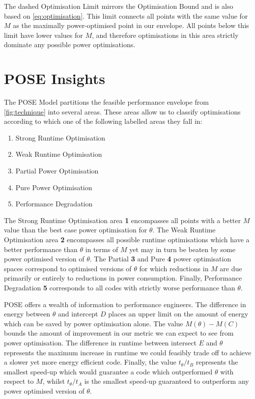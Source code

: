 The dashed Optimisation Limit  mirrors the Optimisation Bound and is also based on \autoref{eq:optimisation}.
This limit connects all points with the same value for $M$ as the maximally power-optimised point in our envelope.
All points below this limit have lower values for $M$, and therefore optimisations in this area strictly dominate any possible power optimisations. 

\section{POSE Insights}
\label{sec:insights}
The POSE Model partitions the feasible performance envelope from \autoref{fig:technique} into several areas.
These areas allow us to classify optimisations according to which one of the following labelled areas they fall in:

\begin{multicols}{2}
\begin{enumerate}
\item Strong Runtime Optimisation
\item Weak Runtime Optimisation
\item Partial Power Optimisation
\item Pure Power Optimisation
\item Performance Degradation \\ 
\end{enumerate}
\end{multicols}

The Strong Runtime Optimisation area \textbf{1} encompasses all points with a better $M$ value than the best case power optimisation for $\theta$. The Weak Runtime Optimisation area \textbf{2} encompasses all possible runtime optimisations which have a better performance than $\theta$ in terms of $M$ yet may in turn be beaten by some power optimised version of $\theta$. The Partial \textbf{3} and Pure \textbf{4} power optimisation spaces correspond to optimised versions of $\theta$ for which reductions in $M$ are due primarily or entirely to reductions in power consumption.
Finally, Performance Degradation \textbf{5} corresponds to all codes with strictly worse performance than $\theta$.

POSE offers a wealth of information to performance engineers.
The difference in energy between $\theta$ and intercept $D$ places an upper limit on the amount of energy which can be saved by power optimisation alone.
The value $M(\theta) - M(C)$ bounds the amount of improvement in our metric we can expect to see from power optimisation.
The difference in runtime between intersect $E$ and $\theta$ represents the maximum increase in runtime we could feasibly trade off to achieve a slower yet more energy efficient code.
Finally, the value $t_\theta / t_B$ represents the smallest speed-up which would guarantee a code which outperformed $\theta$ with respect to $M$, whilst $t_\theta / t_A$ is the smallest speed-up guaranteed to outperform any power optimised version of $\theta$.

